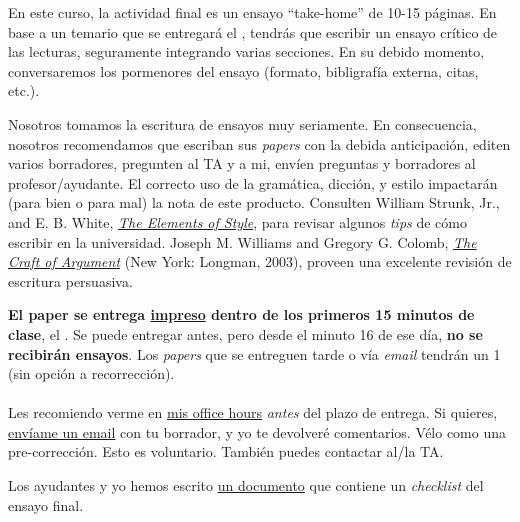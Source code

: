\documentclass[letterpaper]{article}
\renewenvironment{itemize}{
  \begin{list}{}{
    \setlength{\leftmargin}{1.5em}
  }
}{
  \end{list}
}
\begin{document}
\begin{enumerate}
En este curso, la actividad final es un ensayo ``take-home'' de 10-15 p\'aginas. En base a un temario que se entregar\'a el {\unskip}, tendr\'as que escribir un ensayo cr\'itico de las lecturas, seguramente integrando varias secciones. {\color{red}En su debido momento, conversaremos los pormenores del ensayo (formato, bibligraf\'ia externa, citas, etc.)}. 



	\begin{itemize}
		\item[\Pointinghand] Nosotros tomamos la escritura de ensayos muy seriamente. En consecuencia, nosotros recomendamos que escriban sus \emph{papers} con la debida anticipaci\'on, editen varios borradores, pregunten al TA y a mi, env\'ien preguntas y borradores al profesor/ayudante. El correcto uso de la gram\'atica, dicci\'on, y estilo impactar\'an (para bien o para mal) la nota de este producto. Consulten William Strunk, Jr., and E. B. White, \href{http://www.jlakes.org/ch/web/The-elements-of-style.pdf}{\emph{The Elements of Style}}, para revisar algunos \emph{tips} de c\'omo escribir en la universidad. Joseph M. Williams and Gregory G. Colomb, \href{http://sir.spbu.ru/en/programs/master/master_program_in_international_relations/digital_library/Book%20Research%20seminar%20by%20Booth.pdf}{\emph{The Craft of Argument}} (New York: Longman, 2003), proveen una excelente revisi\'on de escritura persuasiva.
	\end{itemize}


	{\bf El paper se entrega \underline{impreso} dentro de los primeros 15 minutos de clase}, el {\bf {\unskip}}. Se puede entregar antes, pero desde el minuto 16 de ese d\'ia, {\bf no se recibir\'an ensayos}. Los \emph{papers} que se entreguen tarde o v\'ia \emph{email} tendr\'an un 1 (sin opci\'on a recorrecci\'on). 
	\\
	\\
	Les recomiendo verme en \href{https://calendly.com/bahamonde/officehours}{mis office hours} \emph{antes} del plazo de entrega. Si quieres, \href{mailto:\filetext}{env\'iame un email} con tu borrador, y yo te devolver\'e comentarios. V\'elo como una pre-correcci\'on. Esto es voluntario. Tambi\'en puedes contactar al/la TA. 

	\begin{itemize}
		\item[\Pointinghand] Los ayudantes y yo hemos escrito \href{https://github.com/hbahamonde/Intro_Ciencias_Sociales/raw/master/Ensayo_Final/Bahamonde_Ensayo_Checklist.pdf}{un documento} que contiene un \emph{checklist} del ensayo final.
	\end{itemize}

\end{enumerate}
\end{document}
